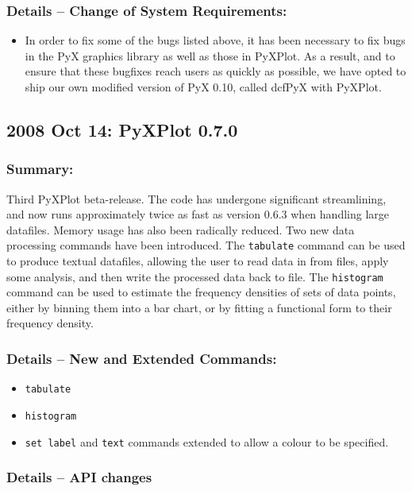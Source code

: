 \subsubsection*{Details -- Change of System Requirements:}

\begin{itemize}
\item In order to fix some of the bugs listed above, it has been necessary to
fix bugs in the PyX graphics library as well as those in PyXPlot. As a result,
and to ensure that these bugfixes reach users as quickly as possible, we have
opted to ship our own modified version of PyX 0.10, called dcfPyX with PyXPlot.
\end{itemize}

\subsection*{2008 Oct 14: PyXPlot 0.7.0}

\subsubsection*{Summary:}

Third PyXPlot beta-release. The code has undergone significant streamlining,
and now runs approximately twice as fast as version 0.6.3 when handling large
datafiles. Memory usage has also been radically reduced. Two new data
processing commands have been introduced. The {\tt tabulate} command can be
used to produce textual datafiles, allowing the user to read data in from
files, apply some analysis, and then write the processed data back to file. The
{\tt histogram} command can be used to estimate the frequency densities of sets
of data points, either by binning them into a bar chart, or by fitting a
functional form to their frequency density.

\subsubsection*{Details -- New and Extended Commands:}

\begin{itemize}
\item {\tt tabulate}
\item {\tt histogram}
\item {\tt set label} and {\tt text} commands extended to allow a colour to be
specified.
\end{itemize}

\subsubsection*{Details -- API changes}

